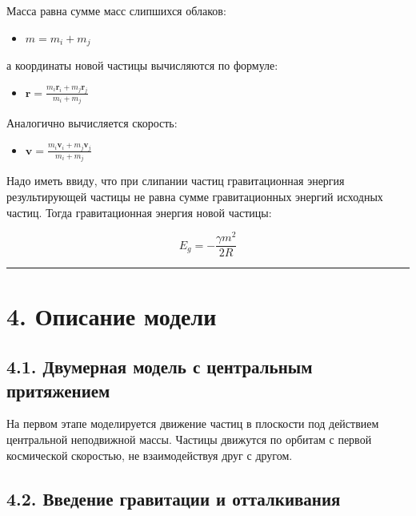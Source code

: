 \documentclass[
  english,
  russian,
  12pt,
  a4paper,
  DIV=11,
  numbers=noendperiod]{scrreprt}
\providecommand{\tightlist}{%
  \setlength{\itemsep}{0pt}\setlength{\parskip}{0pt}}
\begin{document}
Масса равна сумме масс слипшихся облаков:

\begin{itemize}
\tightlist
\item
  \(m = m_i + m_j\)
\end{itemize}

а координаты новой частицы вычисляются по формуле:

\begin{itemize}
\tightlist
\item
  \(\mathbf{r} = \frac{m_i \mathbf{r}_i + m_j \mathbf{r}_j}{m_i + m_j}\)
\end{itemize}

Аналогично вычисляется скорость:

\begin{itemize}
\tightlist
\item
  \(\mathbf{v} = \frac{m_i \mathbf{v}_i + m_j \mathbf{v}_j}{m_i + m_j}\)
\end{itemize}

Надо иметь ввиду, что при слипании частиц гравитационная энергия
результирующей частицы не равна сумме гравитационных энергий исходных
частиц. Тогда гравитационная энергия новой частицы:

\[
E_g = -\frac{\gamma m^2}{2R}
\]

\begin{center}\rule{0.5\linewidth}{0.5pt}\end{center}

\section{4. Описание
модели}\label{ux43eux43fux438ux441ux430ux43dux438ux435-ux43cux43eux434ux435ux43bux438}

\subsection{4.1. Двумерная модель с центральным
притяжением}\label{ux434ux432ux443ux43cux435ux440ux43dux430ux44f-ux43cux43eux434ux435ux43bux44c-ux441-ux446ux435ux43dux442ux440ux430ux43bux44cux43dux44bux43c-ux43fux440ux438ux442ux44fux436ux435ux43dux438ux435ux43c}

На первом этапе моделируется движение частиц в плоскости под действием
центральной неподвижной массы. Частицы движутся по орбитам с первой
космической скоростью, не взаимодействуя друг с другом.

\subsection{4.2. Введение гравитации и
отталкивания}\label{ux432ux432ux435ux434ux435ux43dux438ux435-ux433ux440ux430ux432ux438ux442ux430ux446ux438ux438-ux438-ux43eux442ux442ux430ux43bux43aux438ux432ux430ux43dux438ux44f}
\end{document}
